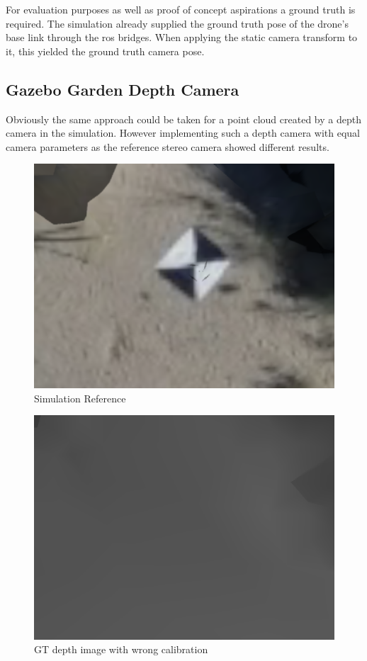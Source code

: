 For evaluation purposes as well as proof of concept aspirations a ground truth is required. The simulation already supplied the ground truth pose of the drone's base link through the ros bridges. When applying the static camera transform to it, this yielded the ground truth camera pose.

\subsection{Gazebo Garden Depth Camera}\label{subsec:gz_depth_camera}

Obviously the same approach could be taken for a point cloud created by a depth camera in the simulation. However implementing such a depth camera with equal camera parameters as the reference stereo camera showed different results.


\begin{figure}[ht]
    \centering
    \includegraphics[scale=0.4]{images/preparation/GT_error_sim.png}
    \caption{Simulation Reference}
    \label{fig:GT_error_sim}
\end{figure}
\begin{figure}
    \centering
    \includegraphics[scale=0.4]{images/preparation/GT_error_GT.png}
    \caption{GT depth image with wrong calibration}
    \label{fig:GT_error_GT}
\end{figure}

